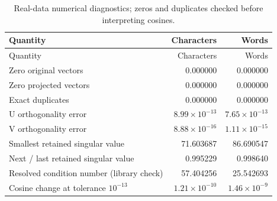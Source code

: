 {\small\renewcommand{\arraystretch}{1.05}
\begin{longtable}{lrr}
\caption{Real-data numerical diagnostics; zeros and duplicates checked before interpreting cosines.}\\
\toprule
Quantity & Characters & Words \\ \midrule\endfirsthead
\toprule
Quantity & Characters & Words \\ \midrule\endhead
Zero original vectors & 0.000000 & 0.000000 \\
Zero projected vectors & 0.000000 & 0.000000 \\
Exact duplicates & 0.000000 & 0.000000 \\
U orthogonality error & $8.99\times10^{-13}$ & $7.65\times10^{-13}$ \\
V orthogonality error & $8.88\times10^{-16}$ & $1.11\times10^{-15}$ \\
Smallest retained singular value & 71.603687 & 86.690547 \\
Next / last retained singular value & 0.995229 & 0.998640 \\
Resolved condition number (library check) & 57.404256 & 25.542693 \\
Cosine change at tolerance $10^{-13}$ & $1.21\times10^{-10}$ & $1.46\times10^{-9}$ \\
\bottomrule
\end{longtable}
}
